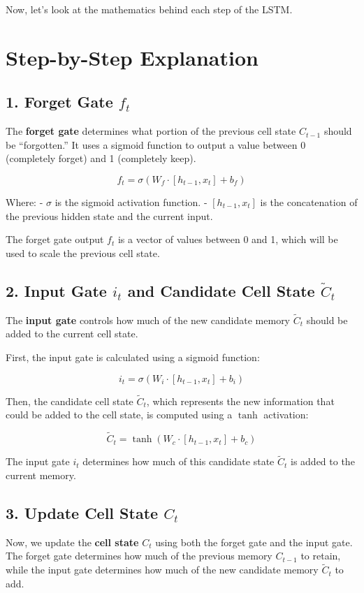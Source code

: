 \documentclass[10pt]{article}
\begin{document}
Now, let’s look at the mathematics behind each step of the LSTM.

\section{ Step-by-Step Explanation}

\subsection{ 1. Forget Gate \( f_t \)}
The {\bf forget gate} determines what portion of the previous cell state \( C_{t-1} \) should be “forgotten.” It uses a sigmoid function to output a value between 0 (completely forget) and 1 (completely keep).

\[
f_t = \sigma(W_f \cdot [h_{t-1}, x_t] + b_f)
\]

Where:
- \( \sigma \) is the sigmoid activation function.
- \( [h_{t-1}, x_t] \) is the concatenation of the previous hidden state and the current input.

The forget gate output \( f_t \) is a vector of values between 0 and 1, which will be used to scale the previous cell state.

\subsection{ 2. Input Gate \( i_t \) and Candidate Cell State \( \tilde{C}_t \)}
The {\bf input gate} controls how much of the new candidate memory \( \tilde{C}_t \) should be added to the current cell state.

First, the input gate is calculated using a sigmoid function:

\[
i_t = \sigma(W_i \cdot [h_{t-1}, x_t] + b_i)
\]

Then, the candidate cell state \( \tilde{C}_t \), which represents the new information that could be added to the cell state, is computed using a \( \tanh \) activation:

\[
\tilde{C}_t = \tanh(W_c \cdot [h_{t-1}, x_t] + b_c)
\]

The input gate \( i_t \) determines how much of this candidate state \( \tilde{C}_t \) is added to the current memory.

\subsection{ 3. Update Cell State \( C_t \)}
Now, we update the {\bf cell state} \( C_t \) using both the forget gate and the input gate. The forget gate determines how much of the previous memory \( C_{t-1} \) to retain, while the input gate determines how much of the new candidate memory \( \tilde{C}_t \) to add.
\end{document}
